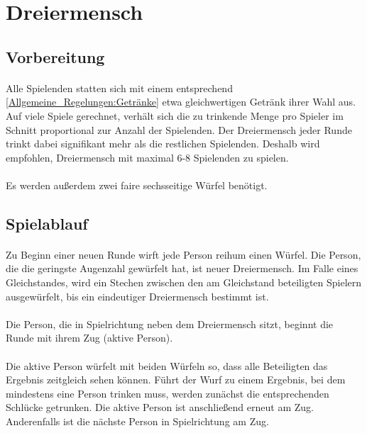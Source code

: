 \section{Dreiermensch}

\subsection{Vorbereitung}
\paragraph{}
Alle Spielenden statten sich mit einem entsprechend \ref{Allgemeine_Regelungen:Getränke} etwa gleichwertigen Getränk ihrer Wahl aus.
Auf viele Spiele gerechnet, verhält sich die zu trinkende Menge pro Spieler im Schnitt proportional zur Anzahl der Spielenden.
Der Dreiermensch jeder Runde trinkt dabei signifikant mehr als die restlichen Spielenden.
Deshalb wird empfohlen, Dreiermensch mit maximal 6-8 Spielenden zu spielen.

\paragraph{}
Es werden außerdem zwei faire sechsseitige Würfel benötigt.

\subsection{Spielablauf}
\paragraph{} \label{Dreiermensch:Spielablauf:NeueRunde}
Zu Beginn einer neuen Runde wirft jede Person reihum einen Würfel.
Die Person, die die geringste Augenzahl gewürfelt hat, ist neuer Dreiermensch.
Im Falle eines Gleichstandes, wird ein Stechen zwischen den am Gleichstand beteiligten Spielern ausgewürfelt, bis ein eindeutiger Dreiermensch bestimmt ist.

\paragraph{}
Die Person, die in Spielrichtung neben dem Dreiermensch sitzt, beginnt die Runde mit ihrem Zug (\glqq aktive Person\grqq{}).

\paragraph{}
Die aktive Person würfelt mit beiden Würfeln so, dass alle Beteiligten das Ergebnis zeitgleich sehen können.
Führt der Wurf zu einem Ergebnis, bei dem mindestens eine Person trinken muss, werden zunächst die entsprechenden Schlücke getrunken.
Die aktive Person ist anschließend erneut am Zug.
Anderenfalls ist die nächste Person in Spielrichtung am Zug.

